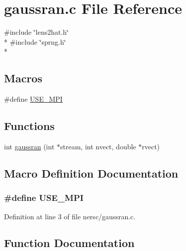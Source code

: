 \section{gaussran.\-c File Reference}
\label{nersc_2gaussran_8c}
{\ttfamily \#include \char`\"{}lens2hat.\-h\char`\"{}}\\*
{\ttfamily \#include \char`\"{}sprng.\-h\char`\"{}}\\*
\subsection*{Macros}
\begin{DoxyCompactItemize}
\item 
\#define \hyperlink{nersc_2gaussran_8c_a3869d282031f6ea6b50fdb980b758420}{U\-S\-E\-\_\-\-M\-P\-I}
\end{DoxyCompactItemize}
\subsection*{Functions}
\begin{DoxyCompactItemize}
\item 
int \hyperlink{nersc_2gaussran_8c_a467c7a00719892a0f87fc03e4c93c2ae}{gaussran} (int $\ast$stream, int nvect, double $\ast$rvect)
\end{DoxyCompactItemize}


\subsection{Macro Definition Documentation}
\subsubsection[{U\-S\-E\-\_\-\-M\-P\-I}]{\setlength{\rightskip}{0pt plus 5cm}\#define U\-S\-E\-\_\-\-M\-P\-I}\label{nersc_2gaussran_8c_a3869d282031f6ea6b50fdb980b758420}


Definition at line 3 of file nersc/gaussran.\-c.



\subsection{Function Documentation}

